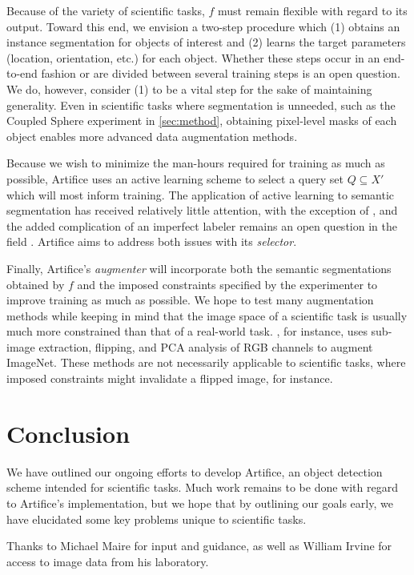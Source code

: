 \documentclass[twocolumn, 10pt]{asme2ej} %
\begin{document}
Because of the variety of scientific tasks, $f$ must remain flexible with regard
to its output. Toward this end, we envision a two-step procedure which (1)
obtains an instance segmentation \cite{ronneberger_u-net:_2015, bai_deep_2016}
for objects of interest and (2) learns the target parameters (location,
orientation, etc.) for each object. Whether these steps occur in an end-to-end
fashion or are divided between several training steps is an open question. We
do, however, consider (1) to be a vital step for the sake of maintaining
generality. Even in scientific tasks where segmentation is unneeded, such as the
Coupled Sphere experiment in \ref{sec:method}, obtaining pixel-level masks of
each object enables more advanced data augmentation methods.

Because we wish to minimize the man-hours required for training as much as
possible, Artifice uses an active learning scheme to select a query set
$Q \subseteq X'$ which will most inform training. The application of active
learning to semantic segmentation has received relatively little attention, with
the exception of \cite{vezhnevets_active_2012}, and the added complication of an
imperfect labeler remains an open question in the field
\cite{settles_active_2012}. Artifice aims to address both issues with its
\emph{selector}.

Finally, Artifice's \emph{augmenter} will incorporate both the semantic
segmentations obtained by $f$ and the imposed constraints specified by the
experimenter to improve training as much as possible. We hope to test many
augmentation methods while keeping in mind that the image space of a scientific
task is usually much more constrained than that of a real-world
task. \cite{krizhevsky_imagenet_2012}, for instance, uses sub-image extraction,
flipping, and PCA analysis of RGB channels to augment ImageNet. These methods are
not necessarily applicable to scientific tasks, where imposed constraints might
invalidate a flipped image, for instance.

\section{Conclusion}
\label{sec:conclusion}

We have outlined our ongoing efforts to develop Artifice, an object detection
scheme intended for scientific tasks. Much work remains to be done with regard
to Artifice's implementation, but we hope that by outlining our goals early, we
have elucidated some key problems unique to scientific tasks.

\begin{acknowledgment}
  Thanks to Michael Maire for input and guidance, as well as William Irvine for
  access to image data from his laboratory.
\end{acknowledgment}



\end{document}
